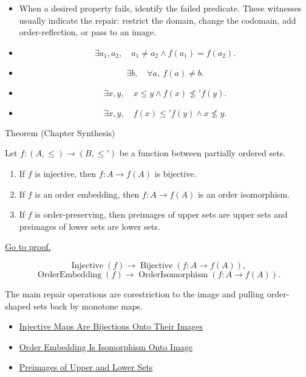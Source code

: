 \begin{remark*}
\begin{itemize}
\item[Exposition.]
When a desired property fails, identify the failed predicate.
These witnesses usually indicate the repair: restrict the domain, change the
codomain, add order-reflection, or pass to an image.
\item[Injectivity failure.]
\[
  \exists a_1,a_2,\quad a_1\neq a_2\wedge f(a_1)=f(a_2).
\]
\item[Surjectivity failure.]
\[
  \exists b,\quad \forall a,\ f(a)\neq b.
\]
\item[Order-preservation failure.]
\[
  \exists x,y,\quad x\leq y\wedge f(x)\nleq' f(y).
\]
\item[Order-reflection failure.]
\[
  \exists x,y,\quad f(x)\leq' f(y)\wedge x\nleq y.
\]
\end{itemize}
\end{remark*}

\begin{theorembox}{Theorem (Chapter Synthesis)}
\begin{theorem}\label{thm:fo-synthesis}
Let $f:(A,\leq)\to(B,\leq')$ be a function between partially ordered sets.
\begin{enumerate}[label=(\roman*)]
\item If $f$ is injective, then $f:A\to f(A)$ is bijective.
\item If $f$ is an order embedding, then $f:A\to f(A)$ is an order isomorphism.
\item If $f$ is order-preserving, then preimages of upper sets are upper sets
and preimages of lower sets are lower sets.
\end{enumerate}
\hyperref[prf:fo-synthesis]{Go to proof.}
\end{theorem}
\end{theorembox}

\begin{remark*}
\[
  \operatorname{Injective}(f)\to \operatorname{Bijective}(f:A\to f(A)),
\]
\[
  \operatorname{OrderEmbedding}(f)\to
  \operatorname{OrderIsomorphism}(f:A\to f(A)).
\]
\end{remark*}

\begin{remark*}[Interpretation]
The main repair operations are corestriction to the image and pulling
order-shaped sets back by monotone maps.
\end{remark*}

\begin{dependencies}
\begin{itemize}
  \item \hyperref[thm:injective-bijection-onto-image]{Injective Maps Are Bijections Onto Their Images}
  \item \hyperref[thm:order-embedding-isomorphism-onto-image]{Order Embedding Is Isomorphism Onto Image}
  \item \hyperref[thm:preimage-upper-lower-sets]{Preimages of Upper and Lower Sets}
\end{itemize}
\end{dependencies}

